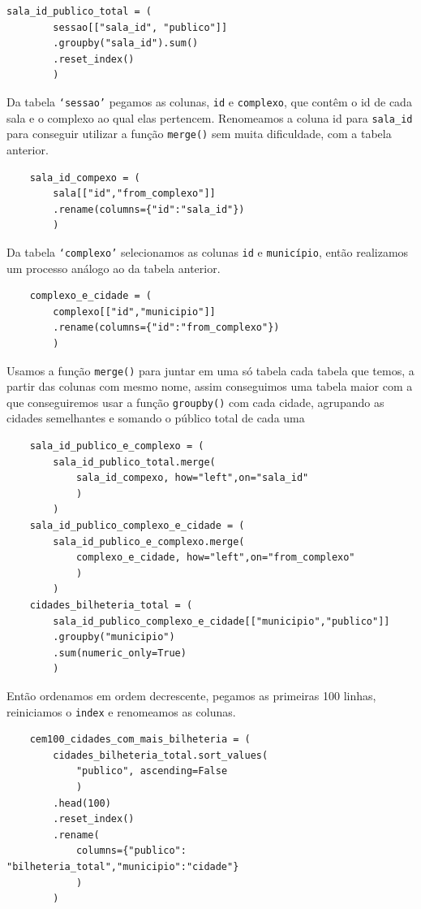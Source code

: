 \documentclass[12pt, a4paper]{article}
\begin{document}
\begin{verbatim}
sala_id_publico_total = (
        sessao[["sala_id", "publico"]]
        .groupby("sala_id").sum()
        .reset_index()
        )
\end{verbatim}

Da tabela \texttt{`sessao'} pegamos as colunas, \texttt{id} e \texttt{complexo}, que contêm o id de cada sala e o complexo ao qual elas pertencem. Renomeamos a coluna id para \verb|sala_id| para conseguir utilizar a função \texttt{merge()} sem muita dificuldade, com a tabela anterior.
    
\begin{verbatim}
    sala_id_compexo = (
        sala[["id","from_complexo"]]
        .rename(columns={"id":"sala_id"})
        )
\end{verbatim}
Da tabela \texttt{`complexo'} selecionamos as colunas \texttt{id} e \texttt{município}, então realizamos um processo análogo ao da tabela anterior.

\begin{verbatim}
    complexo_e_cidade = (
        complexo[["id","municipio"]]
        .rename(columns={"id":"from_complexo"})
        )
\end{verbatim}

Usamos a função \texttt{merge()} para juntar em uma só tabela cada tabela que temos, a partir das colunas com mesmo nome, assim conseguimos uma tabela maior com a que conseguiremos usar a função \texttt{groupby()} com cada cidade, agrupando as cidades semelhantes e somando o público total de cada uma

\begin{verbatim}
    sala_id_publico_e_complexo = (
        sala_id_publico_total.merge(
            sala_id_compexo, how="left",on="sala_id"
            )
        )
    sala_id_publico_complexo_e_cidade = (
        sala_id_publico_e_complexo.merge(
            complexo_e_cidade, how="left",on="from_complexo"
            )
        )
    cidades_bilheteria_total = (
        sala_id_publico_complexo_e_cidade[["municipio","publico"]]
        .groupby("municipio")
        .sum(numeric_only=True)
        )
\end{verbatim}
Então ordenamos em ordem decrescente, pegamos as primeiras 100 linhas, reiniciamos o \texttt{index} e renomeamos as colunas.

\begin{verbatim}
    cem100_cidades_com_mais_bilheteria = (
        cidades_bilheteria_total.sort_values(
            "publico", ascending=False
            )
        .head(100)
        .reset_index()
        .rename(
            columns={"publico": "bilheteria_total","municipio":"cidade"}
            )
        )
\end{verbatim}
\end{document}

